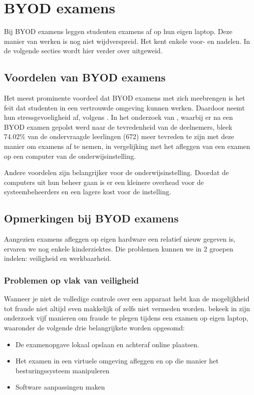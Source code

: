 \section{BYOD examens}
Bij BYOD examens leggen studenten examens af op hun eigen laptop. Deze manier van werken is nog niet wijdverspreid. Het kent enkele voor- en nadelen. In de volgende secties wordt hier verder over uitgeweid. 

\subsection{Voordelen van BYOD examens}
Het meest prominente voordeel dat BYOD examens met zich meebrengen is het feit dat studenten in een vertrouwde omgeving kunnen werken. Daardoor neemt hun stressgevoeligheid af, volgens
\textcite{TeckSwee2014}. In het onderzoek van \textcite{TeckSwee2014}, waarbij er na een BYOD examen gepolst werd naar de tevredenheid van de deelnemers, bleek 74.02\% van de ondervraagde leerlingen (672) meer tevreden te zijn met deze manier om examens af te nemen, in vergelijking met het afleggen van een examen op een computer van de onderwijsinstelling. 

Andere voordelen zijn belangrijker voor de onderwijsinstelling. Doordat de computers uit hun beheer gaan is er een kleinere overhead voor de systeembeheerders en een lagere kost voor de instelling.

\subsection{Opmerkingen bij BYOD examens}

Aangezien examens afleggen op eigen hardware een relatief nieuw gegeven is, ervaren we nog enkele kinderziektes. Die problemen kunnen we in 2 groepen indelen: veiligheid en werkbaarheid.\\ 

\subsubsection{Problemen op vlak van veiligheid}
Wanneer je niet de volledige controle over een apparaat hebt kan de mogelijkheid tot fraude niet altijd even makkelijk of zelfs niet vermeden worden.
\textcite{Dawson2016} bekeek in zijn onderzoek vijf manieren om fraude te plegen tijdens een examen op eigen laptop, waaronder de volgende drie belangrijkste worden opgesomd: 
\begin{itemize}
	\item De examenopgave lokaal opslaan en achteraf online plaatsen.
	\item Het examen in een virtuele omgeving afleggen en op die manier het besturingssysteem manipuleren
	\item Software aanpassingen maken 

\end{itemize}

